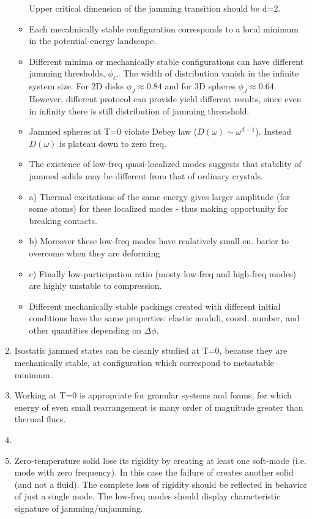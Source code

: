 \documentclass[10pt,a4paper]{article}
\begin{document}
\begin{enumerate}
\begin{itemize}
  Upper critical dimension of the jamming transition should be d=2.
  \item Each mecahnically stable configuration corresponds to a local minimum in the potential-energy landscape.
  \item Different minima or mechanically stable configurations can have different jamming thresholds, $\phi_C$. 
  The width of distribution vanish in the infinite system size. For 2D disks $\phi_J\approx0.84$ and for 3D spheres $\phi_J \approx 0.64$.
  However, different protocol can provide yield different results, since even in infinity there is still distribution of jamming threashold. 
  \item Jammed spheres at T=0 violate Debey law ($D(\omega)\sim\omega^{d-1}$). Instead $D(\omega)$ is plateau down to zero freq.
  \item The existence of low-freq quasi-localized modes suggests that stability of jammed solids may be different from that of ordinary crystals.
  \item a) Thermal excitations of the same energy gives larger amplitude (for some atoms) for these localized modes - thus making opportunity for breaking contacts.
  \item b) Moreover these low-freq modes have realatively small en. barier to overcome when they are deforming
  \item c) Finally low-participation ratio (mosty low-freq and high-freq modes) are highly unstable to compression.
  \item Different mechanically stable packings created with different initial conditions have the same properties: elastic moduli, coord. number, and other quantities depending on $\Delta \phi$.
 \end{itemize}
 \item Isostatic jammed states can be cleanly studied at T=0, because they are mechanically stable, at configuration which correspond to metastable minimum.
 \item Working at T=0 is appropriate for granular systems and foams, for which energy of even small rearrangement is many order of magnitude greater than thermal flucs.
 \item 
 \item Zero-temperature solid lose its rigidity by creating at least one soft-mode (i.e. mode with zero frequency). 
 In this case the failure of creates another solid (and not a fluid). The complete loss of rigidity should be reflected in behavior
 of just a single mode. The low-freq modes should display characteristic signature of jamming/unjamming. 

\end{enumerate}
\end{document}
